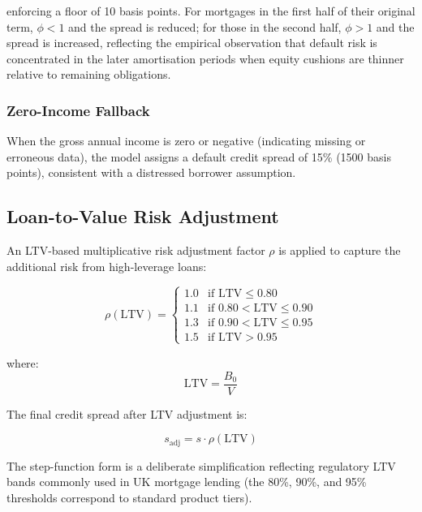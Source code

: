 \documentclass[11pt,a4paper]{article}
\begin{document}
\noindent enforcing a floor of 10 basis points. For mortgages in the first half of
their original term, $\phi < 1$ and the spread is reduced; for those in the second half,
$\phi > 1$ and the spread is increased, reflecting the empirical observation that
default risk is concentrated in the later amortisation periods when equity cushions are
thinner relative to remaining obligations.

\subsubsection{Zero-Income Fallback}

When the gross annual income is zero or negative (indicating missing or erroneous
data), the model assigns a default credit spread of 15\% (1500 basis points), consistent
with a distressed borrower assumption.

\subsection{Loan-to-Value Risk Adjustment}
\label{sec:ltv}

An LTV-based multiplicative risk adjustment factor $\rho$ is applied to capture the
additional risk from high-leverage loans:

\begin{equation}
\label{eq:ltv_factor}
\rho(\text{LTV}) =
\begin{cases}
1.0 & \text{if } \text{LTV} \leq 0.80 \\
1.1 & \text{if } 0.80 < \text{LTV} \leq 0.90 \\
1.3 & \text{if } 0.90 < \text{LTV} \leq 0.95 \\
1.5 & \text{if } \text{LTV} > 0.95
\end{cases}
\end{equation}

\noindent where:
\begin{equation}
\text{LTV} = \frac{B_0}{V}
\end{equation}

\noindent The final credit spread after LTV adjustment is:

\begin{equation}
\label{eq:ltv_adjusted_spread}
s_{\text{adj}} = s \cdot \rho(\text{LTV})
\end{equation}

\noindent The step-function form is a deliberate simplification reflecting regulatory LTV
bands commonly used in UK mortgage lending (the 80\%, 90\%, and 95\% thresholds
correspond to standard product tiers).
\end{document}
